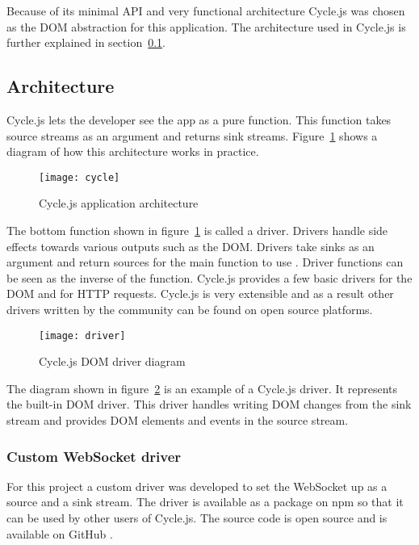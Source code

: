 Because of its minimal API and very functional architecture Cycle.js was chosen as the DOM abstraction for this application. The architecture used in Cycle.js is further explained in  section~\ref{sec:arch}.


\subsection{Architecture}
\label{sec:arch}

Cycle.js lets the developer see the app as a pure function. This  function takes source streams as an argument and returns sink streams. Figure~\ref{figure:cycle} shows a diagram of how this architecture works in practice.

\begin{figure}[H]
	\centering
	\texttt{[image: cycle]}
	\caption{Cycle.js application architecture \cite{cycle}}
	\label{figure:cycle}
\end{figure}

The bottom function shown in figure~\ref{figure:cycle} is called a driver. Drivers handle side effects towards various outputs such as the DOM. Drivers take sinks as an argument and return sources for the main function to use \cite{cycle-drivers}. Driver functions can be seen as the inverse of the  function. Cycle.js provides a few basic drivers for the DOM and for HTTP requests. Cycle.js is very extensible \cite{cycle-drivers} and as a result other drivers written by the community can be found on open source platforms.

\begin{figure}[H]
	\centering
	\texttt{[image: driver]}
	\caption{Cycle.js DOM driver diagram \cite{cycle-drivers}}
	\label{figure:driver}
\end{figure}

The diagram shown in figure~\ref{figure:driver} is an example of a Cycle.js driver. It represents the built-in DOM driver. This driver handles writing DOM changes from the sink stream and provides DOM elements and events in the source stream.

\subsubsection{Custom WebSocket driver}

For this project a custom driver was developed to set the WebSocket up as a source and a sink stream. The driver is available as a package on npm \cite{driver-npm} so that it can be used by other users of Cycle.js. The source code is open source and is available on GitHub \cite{driver-github}.

